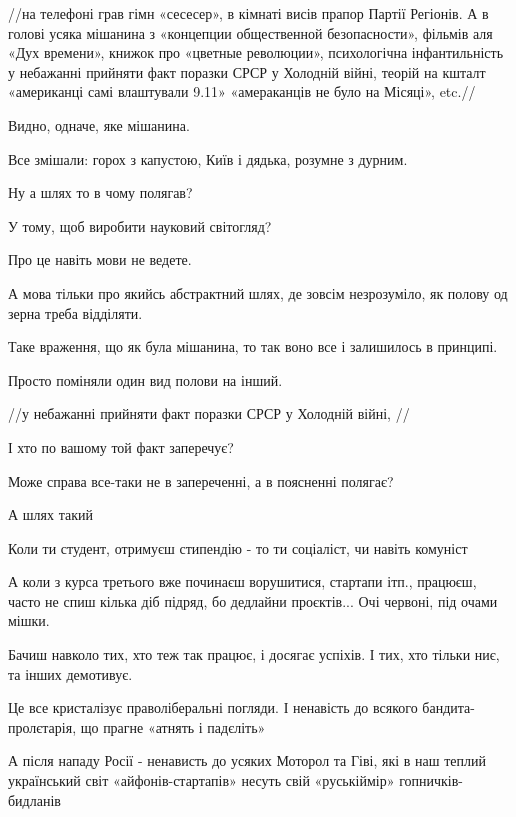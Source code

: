 \begin{itemize}
\begin{itemize}
//на телефоні грав гімн «сесесер», в кімнаті висів прапор Партії Регіонів. А в
голові усяка мішанина з «концепции общественной безопасности», фільмів аля «Дух
времени», книжок про «цветные революции», психологічна інфантильність у
небажанні прийняти факт поразки СРСР у Холодній війні, теорій на кшталт
«американці самі влаштували 9.11» «амераканців не було на Місяці», etc.//

Видно, одначе, яке мішанина.

Все змішали: горох з капустою, Київ і дядька, розумне з дурним.

Ну а шлях то в чому полягав?

У тому, щоб виробити науковий світогляд?

Про це навіть мови не ведете.

А мова тільки про якийсь абстрактний шлях, де зовсім незрозуміло, як полову од
зерна треба відділяти.

Таке враження, що як була мішанина, то так воно все і залишилось в принципі.

Просто поміняли один вид полови на інший.

//у небажанні прийняти факт поразки СРСР у Холодній війні, //

І хто по вашому той факт заперечує?

Може справа все-таки не в запереченні, а в поясненні полягає?

 

А шлях такий

Коли ти студент, отримуєш стипендію - то ти соціаліст, чи навіть комуніст

А коли з курса третього вже починаєш ворушитися, стартапи ітп., працюєш, часто
не спиш кілька діб підряд, бо дедлайни проєктів... Очі червоні, під очами мішки.

Бачиш навколо тих, хто теж так працює, і досягає успіхів. І тих, хто тільки
ниє, та інших демотивує.

Це все кристалізує праволіберальні погляди. І ненавість до всякого
бандита-пролєтарія, що прагне «атнять і падєліть»

А після нападу Росії - ненависть до усяких Моторол та Гіві, які в наш теплий
український світ «айфонів-стартапів» несуть свій «руськіймір»
гопничків-бидланів


\end{itemize}
\end{itemize}
